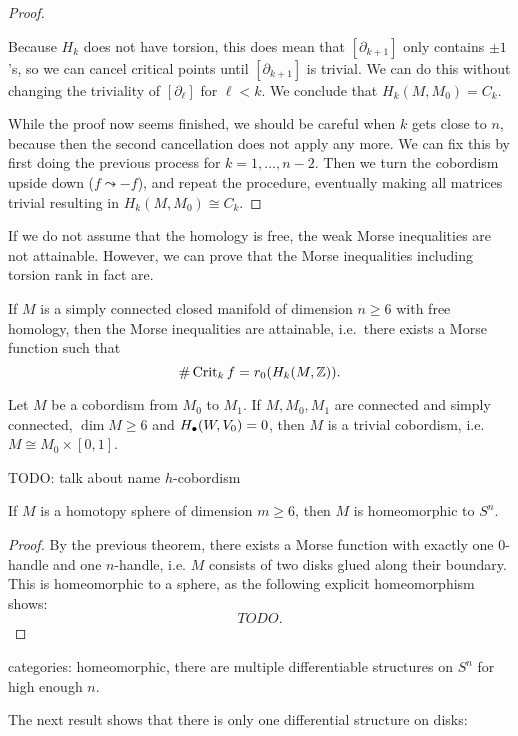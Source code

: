 \begin{proof}
\begin{enumerate}
            Because $H_k$ does not have torsion, this does mean that $[\partial_{k+1}]$ only contains $\pm 1$'s, so we can cancel critical points until  $[\partial_{k+1}]$ is trivial. We can do this without changing the triviality of $[\partial_\ell]$ for $\ell < k$.
            We conclude that $H_k(M, M_0) = C_k$.
    \end{enumerate}
    While the proof now seems finished, we should be careful when $k$ gets close to  $n$, because then the second cancellation does not apply any more.
    We can fix this by first doing the previous process for $k = 1, \ldots, n-2$. 
    Then we turn the cobordism upside down ($f \leadsto -f$), and repeat the procedure, eventually making all matrices trivial resulting in $H_k(M, M_0) \cong C_k$.
\end{proof}
\begin{remark}
    If we do not assume that the homology is free, the weak Morse inequalities are not attainable.
    However, we can prove that the Morse inequalities including torsion rank in fact are.
\end{remark}
\begin{corollary}
    If $M$ is a simply connected closed manifold of dimension  $n \ge 6$ with free homology, then the Morse inequalities are attainable, i.e.\ there exists a Morse function such that
    \[
        \# \operatorname{Crit}_kf = r_0 (H_k(M, \mathbb{Z}))
    .\] 
\end{corollary}

\begin{corollary}
    Let $M$ be a cobordism from  $M_0$ to $M_1$.
    If $M, M_0, M_1$ are connected and simply connected, $\dim M \ge  6$ and $H_{\bullet}(W, V_0) = 0$, then $M$ is a trivial cobordism, i.e.  $M \cong M_0 \times [0,1]$.
\end{corollary}

TODO: talk about name $h$-cobordism

\begin{corollary}
    If $M$ is a homotopy sphere of dimension  $m \ge  6$, then $M$ is homeomorphic to  $S^{n}$.
\end{corollary}
\begin{proof}
    By the previous theorem, there exists a Morse function with exactly one $0$-handle and one $n$-handle, i.e. $M$ consists of two disks glued along their boundary. This is homeomorphic to a sphere, as the following explicit homeomorphism shows:
     \[
    TODO
    .\] 
\end{proof}
\begin{remark}
    categories: homeomorphic, there are multiple differentiable structures on $S^{n}$ for high enough $n$.
\end{remark}
The next result shows that there is only one differential structure on disks:

